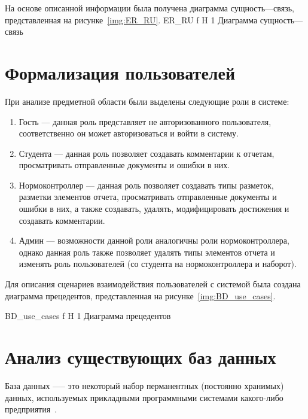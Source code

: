 \newpage
На основе описанной информации была получена диаграмма сущность---связь, представленная на рисунке~\ref{img:ER_RU}.
{ER_RU} %
{f} %
{H} %
{1\textwidth} %
{Диаграмма сущность---связь} %


\section{Формализация пользователей}
При анализе предметной области были выделены следующие роли в системе:
\begin{enumerate}
	\item Гость --- данная роль представляет не авторизованного пользователя, соответственно он может авторизоваться и войти в систему.
	\item Студента --- данная роль позволяет создавать комментарии к отчетам,
	просматривать отправленные документы и ошибки в них.
	\item Нормоконтроллер --- данная роль позволяет создавать типы разметок, разметки элементов отчета, просматривать отправленные документы и ошибки в них, а также создавать, удалять, модифицировать достижения и создавать комментарии.
	\item Админ --- возможности данной роли аналогичны роли нормоконтроллера, однако данная роль также позволяет удалять типы элементов отчета и изменять роль пользователей (со студента на нормоконтроллера и наборот).
\end{enumerate}


Для описания сценариев взаимодействия пользователей с системой была создана диаграмма прецедентов, представленная на рисунке~\ref{img:BD_use_cases}.

{BD_use_cases} %
{f} %
{H} %
{1\textwidth} %
{Диаграмма прецедентов} %


\section{Анализ существующих баз данных}
База данных —-- это некоторый набор перманентных (постоянно хранимых) данных, используемых прикладными программными системами какого-либо предприятия~\cite{williams-db}.

